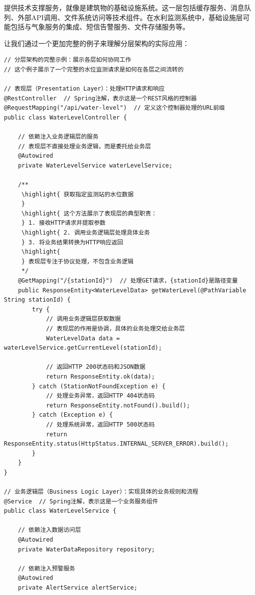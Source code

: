 提供技术支撑服务，就像是建筑物的基础设施系统。这一层包括缓存服务、消息队列、外部API调用、文件系统访问等技术组件。在水利监测系统中，基础设施层可能包括与气象服务的集成、短信告警服务、文件存储服务等。

让我们通过一个更加完整的例子来理解分层架构的实际应用：

\begin{lstlisting}[style=java]
// 分层架构的完整示例：展示各层如何协同工作
// 这个例子展示了一个完整的水位监测请求是如何在各层之间流转的

// 表现层（Presentation Layer）：处理HTTP请求和响应
@RestController  // Spring注解，表示这是一个REST风格的控制器
@RequestMapping("/api/water-level")  // 定义这个控制器处理的URL前缀
public class WaterLevelController {
    
    // 依赖注入业务逻辑层的服务
    // 表现层不直接处理业务逻辑，而是委托给业务层
    @Autowired
    private WaterLevelService waterLevelService;
    
    /**
     \highlight{ 获取指定监测站的水位数据
     } 
     \highlight{ 这个方法展示了表现层的典型职责：
     } 1. 接收HTTP请求并提取参数
     \highlight{ 2. 调用业务逻辑层处理具体业务
     } 3. 将业务结果转换为HTTP响应返回
     \highlight{ 
     } 表现层专注于协议处理，不包含业务逻辑
     */
    @GetMapping("/{stationId}")  // 处理GET请求，{stationId}是路径变量
    public ResponseEntity<WaterLevelData> getWaterLevel(@PathVariable String stationId) {
        try {
            // 调用业务逻辑层获取数据
            // 表现层的作用是协调，具体的业务处理交给业务层
            WaterLevelData data = waterLevelService.getCurrentLevel(stationId);
            
            // 返回HTTP 200状态码和JSON数据
            return ResponseEntity.ok(data);
        } catch (StationNotFoundException e) {
            // 处理业务异常，返回HTTP 404状态码
            return ResponseEntity.notFound().build();
        } catch (Exception e) {
            // 处理系统异常，返回HTTP 500状态码
            return ResponseEntity.status(HttpStatus.INTERNAL_SERVER_ERROR).build();
        }
    }
}

// 业务逻辑层（Business Logic Layer）：实现具体的业务规则和流程
@Service  // Spring注解，表示这是一个业务服务组件
public class WaterLevelService {
    
    // 依赖注入数据访问层
    @Autowired
    private WaterDataRepository repository;
    
    // 依赖注入预警服务
    @Autowired
    private AlertService alertService;
    

\end{lstlisting}
